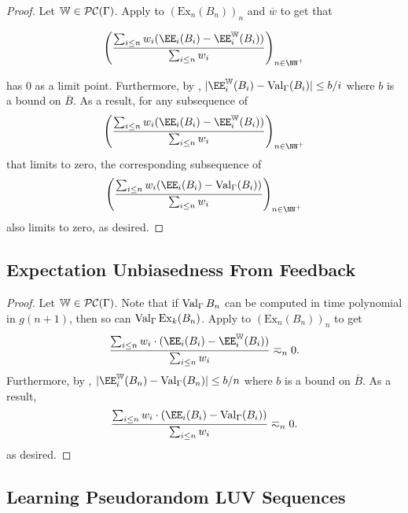 \documentclass[authordate,onecolumn,noenvironments]{miri-tech-article}
\numberwithin{equation}{subsection}
\newcommand{\seq}[1]{{\overline{#1}}}
\newcommand{\nn}{n}
\newcommand{\fuz}{w}
\newcommand{\affluv}{B} %
\newcommand{\alta}{\mathrm{Ex}} %
\newcommand{\cworlds}{\mathcal{P\-C}} %
\newcommand{\World}{\mathbb{W}}
\newcommand{\Theory}{\Gamma}
\newcommand{\thmval}[1][\Theory]{\operatorname{Val}_{#1}\-} %
\begin{document}
\begin{proof}

  Let $\World \in \cworlds(\Gamma)$.  Apply  to $(\alta_n(\affluv_n))_n$ and $\seq\fuz$ to get that

  \[ \left( \frac{\sum_{i \leq n} \fuz_i (\EE_i(\affluv_i) - \EE_i^{\World}(\affluv_i))}{\sum_{i \leq n}\fuz_i} \right)_{n \in \NN^+}  \]

  has 0 as a limit point.  Furthermore, by ,
  $|\EE_i^\World(\affluv_i) - \thmval(\affluv_i)| \leq b/i$
  where $b$ is a bound on $\seq\affluv$.  As a result, for any subsequence of
  \[ \left( \frac{\sum_{i \leq n} \fuz_i (\EE_i(\affluv_i) - \EE_i^{\World}(\affluv_i))}{\sum_{i \leq n}\fuz_i} \right)_{n \in \NN^+} \]
  that limits to zero, the corresponding subsequence of
  \[ \left( \frac{\sum_{i \leq n} \fuz_i (\EE_i(\affluv_i) - \thmval(\affluv_i))}{\sum_{i \leq n}\fuz_i} \right)_{n \in \NN^+} \]
  also limits to zero, as desired.

\end{proof}

\subsection{Expectation Unbiasedness From Feedback}\label{app:wubexp}

\wubexp*

\begin{proof}
  Let $\World \in \cworlds(\Theory)$.  Note that if $\thmval{\affluv_n}$ can be computed in time polynomial in $g(n + 1)$, then so can $\thmval{\alta_k(\affluv_n)}$.  Apply  to $(\alta_n(\affluv_n))_n$ to get
  \[
    \frac
        {\sum_{i\leq \nn}\fuz_i  \cdot(\EE_i(\affluv_i)-\EE_i^\World(\affluv_i))}
        {\sum_{i\leq \nn}\fuz_i}
    \eqsim_\nn 0.
  \]
  Furthermore, by ,
  $|\EE_i^\World(\affluv_n) - \thmval(\affluv_n)| \leq b/n$
  where $b$ is a bound on $\seq\affluv$.  As a result,
  \[
    \frac
        {\sum_{i\leq \nn}\fuz_i  \cdot(\EE_i(\affluv_i)-\thmval(\affluv_i))}
        {\sum_{i\leq \nn}\fuz_i}
    \eqsim_\nn 0.
  \]
  as desired.
\end{proof}


\subsection{Learning Pseudorandom LUV Sequences}\label{app:seqprandexp}\label{app:prandexp}

\prandexp*
\end{document}
